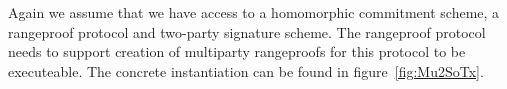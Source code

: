 Again we assume that we have access to a homomorphic commitment scheme, a rangeproof protocol and two-party signature scheme. The rangeproof protocol needs to support creation
of multiparty rangeproofs for this protocol to be executeable. The concrete instantiation can be found in figure~\ref{fig:Mu2SoTx}.
\begin{figure}
    \begin{center}
\end{center}
\end{figure}
